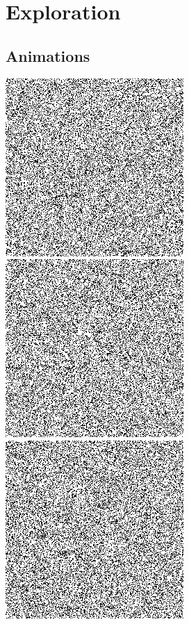 \documentclass[
]{article}
\author{}
\date{\vspace{-2.5em}}
\begin{document}
\hypertarget{exploration}{%
\section{Exploration}\label{exploration}}

\hypertarget{animations}{%
\subsection{Animations}\label{animations}}

\includegraphics{exploration_aleatoire_pile.gif}
\includegraphics{exploration_aleatoire_tas.gif}
\includegraphics{exploration_aleatoire_entrelacer.gif}
\end{document}
